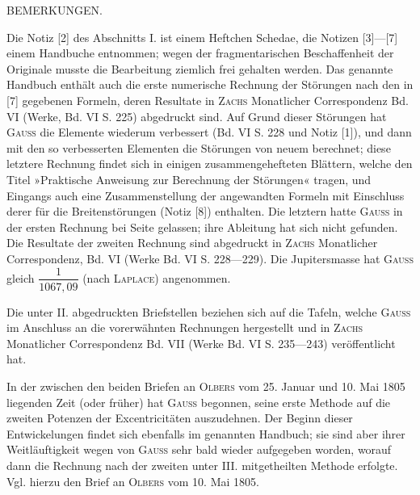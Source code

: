 \par\bigskip{}
\begin{center}BEMERKUNGEN.\end{center}
\begingroup\small
\noindent\hspace*{\parindent}Die Notiz [2] des Abschnitts I. ist einem Heftchen Schedae, die Notizen [3]---[7] einem Handbuche entnommen; wegen der fragmentarischen Beschaffenheit der Originale musste die Bearbeitung ziemlich frei gehalten werden. Das genannte Handbuch enthält auch die erste numerische Rechnung der Störungen nach den in [7] gegebenen Formeln, deren Resultate in \textsc{Zachs} Monatlicher Correspondenz Bd. VI (Werke, Bd. VI S. 225) abgedruckt sind. Auf Grund dieser Störungen hat \textsc{Gauss} die Elemente wiederum verbessert (Bd. VI S. 228 und Notiz [1]), und dann mit den so verbesserten Elementen die Störungen von neuem berechnet; diese letztere Rechnung findet sich in einigen zusammengehefteten Blättern, welche den Titel »Praktische Anweisung zur Berechnung der Störungen« tragen, und Eingangs auch eine Zusammenstellung der angewandten Formeln mit Einschluss derer für die Breitenstörungen (Notiz [8]) enthalten. Die letztern hatte \textsc{Gauss} in der ersten Rechnung bei Seite gelassen; ihre Ableitung hat sich nicht gefunden. Die Resultate der zweiten Rechnung sind abgedruckt in \textsc{Zachs} Monatlicher Correspondenz, Bd. VI (Werke Bd. VI S. 228---229). Die Jupitersmasse hat \textsc{Gauss} gleich \(\dfrac{1}{1067{,}09}\) (nach \textsc{Laplace}) angenommen.

Die unter II. abgedruckten Briefstellen beziehen sich auf die Tafeln, welche \textsc{Gauss} im Anschluss an die vorerwähnten Rechnungen hergestellt und in \textsc{Zachs} Monatlicher Correspondenz Bd. VII (Werke Bd. VI S. 235---243) veröffentlicht hat.

In der zwischen den beiden Briefen an \textsc{Olbers} vom 25. Januar und 10. Mai 1805 liegenden Zeit (oder früher) hat \textsc{Gauss} begonnen, seine erste Methode auf die zweiten Potenzen der Excentricitäten auszudehnen. Der Beginn dieser Entwickelungen findet sich ebenfalls im genannten Handbuch; sie sind aber ihrer Weitläuftigkeit wegen von \textsc{Gauss} sehr bald wieder aufgegeben worden, worauf dann die Rechnung nach der zweiten unter III. mitgetheilten Methode erfolgte. Vgl. hierzu den Brief an \textsc{Olbers} vom 10. Mai 1805.

